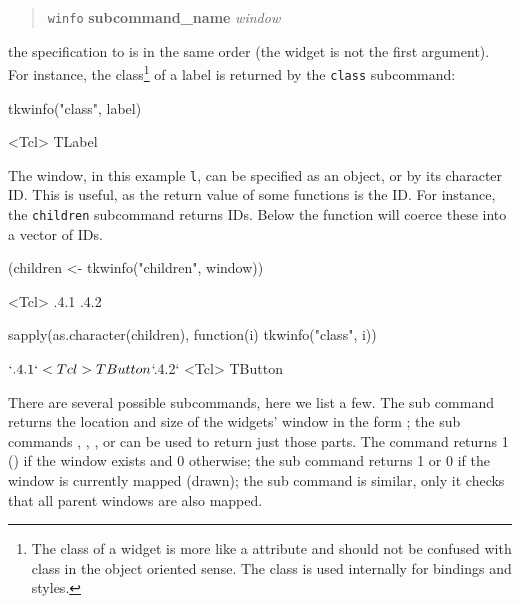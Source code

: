 \begin{quotation}
\texttt{winfo} \textbf{subcommand\_name} \textit{window}  
\end{quotation}
the specification to  is in the same order (the
widget is not the first argument). For instance, the
class\footnote{The class of a widget is more like a attribute and should
  not be confused with class in the object oriented sense. The class
  is used internally for bindings and styles.} of a label
is returned by the \texttt{class} subcommand:

\begin{Schunk}
\begin{Sinput}
 tkwinfo("class", label)
\end{Sinput}
\begin{Soutput}
<Tcl> TLabel 
\end{Soutput}
\end{Schunk}
%

The window, in this example \texttt{l}, can be specified as an \R\/
object, or by its character ID. This is useful, as the return value of
some functions is the ID. For instance, the \texttt{children}
subcommand returns IDs. Below the  function will
coerce these into a vector of IDs.


\begin{Schunk}
\begin{Sinput}
 (children <- tkwinfo("children", window))
\end{Sinput}
\begin{Soutput}
<Tcl> .4.1 .4.2 
\end{Soutput}
\begin{Sinput}
 sapply(as.character(children), function(i) tkwinfo("class", i))
\end{Sinput}
\begin{Soutput}
$`.4.1`
<Tcl> TButton 

$`.4.2`
<Tcl> TButton 
\end{Soutput}
\end{Schunk}

There are several possible subcommands, here we list a few. The
 sub command returns the location and
size of the widgets' window in the form ;
the sub commands ,
, , or
 can be used to return just those parts. The
 command returns 1 () if the
window exists and 0 otherwise; the  sub
command returns 1 or 0 if the window is currently mapped (drawn); the
 sub command is similar, only it checks
that all parent windows are also mapped.  

